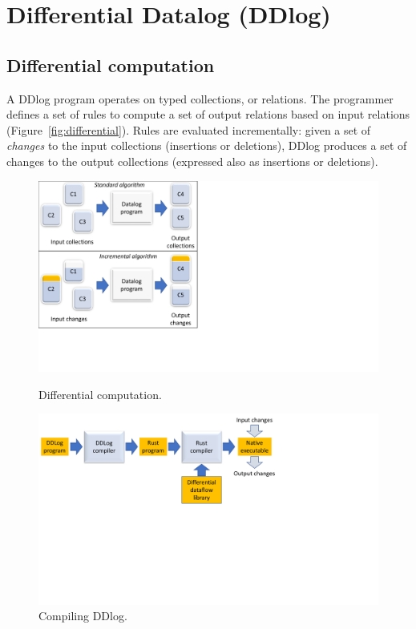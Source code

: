 \section{Differential Datalog (DDlog)}\label{sec-ddlog}

\subsection{Differential computation}

A DDlog program operates on typed collections, or relations.  The
programmer defines a set of rules to compute a set of output relations
based on input relations (Figure~\ref{fig:differential}).  Rules are
evaluated incrementally: given a set of \emph{changes} to the input
collections (insertions or deletions), DDlog produces a set of changes
to the output collections (expressed also as insertions or deletions).

\begin{figure}
  \begin{minipage}{.48\textwidth}
    \includegraphics[width=\columnwidth,clip=true,trim=0in 1.6in 6in
      0in]{differential.pdf}
    \caption{Differential computation.\label{fig:differential}}
  \end{minipage} \hfill
  \begin{minipage}{.48\textwidth}
    \includegraphics[width=\columnwidth,clip=true,trim=0in 4in 4in
      0in]{compiler-flow.pdf}
    \caption{Compiling DDlog.\label{fig:compiler-flow}}
  \end{minipage}
\end{figure}

